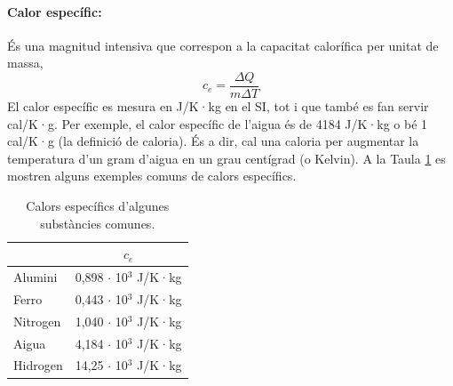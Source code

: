 \documentclass[12pt]{book}
\begin{document}
\paragraph{Calor específic:} És una magnitud intensiva que correspon a la capacitat calorífica per unitat de massa, 
%
\begin{equation}
    \boxed{c_e = \frac{\Delta Q}{m \Delta T}}
\end{equation}
%
El calor específic es mesura en J/K·kg en el SI, tot i que també es fan servir cal/K·g. Per exemple, el calor específic de l'aigua és de 4184 J/K·kg o bé 1 cal/K·g (la definició de caloria). És a dir, cal una caloria per augmentar la temperatura d'un gram d'aigua en un grau centígrad (o Kelvin). A la Taula \ref{tab:CalorsEspecifics} es mostren alguns exemples comuns de calors específics.
%
\begin{table}[H]
    \centering
    \begin{tabular}{|l|c|}
    \hline
                 & $c_e$ \\ \hline
        Alumini  & 0,898 $\cdot$ 10$^{3}$ J/K·kg \\ \hline
        Ferro    & 0,443 $\cdot$ 10$^{3}$ J/K·kg \\ \hline
        Nitrogen & 1,040 $\cdot$ 10$^{3}$ J/K·kg \\ \hline
        Aigua    & 4,184 $\cdot$ 10$^{3}$ J/K·kg \\ \hline
        Hidrogen & 14,25 $\cdot$ 10$^{3}$ J/K·kg \\ \hline
    \end{tabular}
    \caption{Calors específics d'algunes substàncies comunes.}
    \label{tab:CalorsEspecifics}
\end{table}
%
\end{document}
